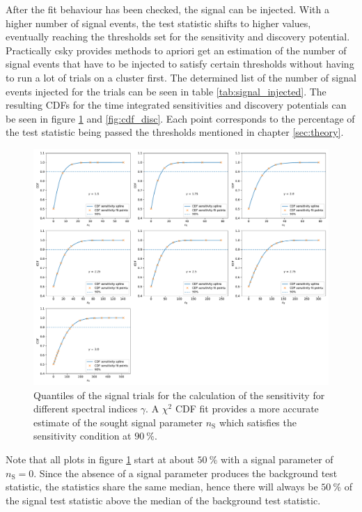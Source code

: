 After the fit behaviour has been checked, the signal can be injected.
With a higher number of signal events, the test statistic shifts to higher values, eventually reaching the thresholds set for the sensitivity and discovery potential.
Practically csky provides methods to apriori get an estimation of the number of signal events that have to be injected to satisfy certain thresholds without having to run a lot of trials on a cluster first.
The determined list of the number of signal events injected for the trials can be seen in table \ref{tab:signal_injected}.
The resulting CDFs for the time integrated sensitivities and discovery potentials can be seen in figure \ref{fig:cdf_sens} and \ref{fig:cdf_disc}.
Each point corresponds to the percentage of the test statistic being passed the thresholds mentioned in chapter \ref{sec:theory}.
\begin{figure}
    \centering
    \includegraphics[width=\linewidth]{Plots/05_csky/9_years_gfu_gold_cdf_sens.pdf}
    \caption{Quantiles of the signal trials for the calculation of the sensitivity for different spectral indices $\gamma$. A $\chi^2$ CDF fit provides a more accurate estimate of the sought signal parameter $n_\text{S}$ which satisfies the sensitivity condition at $\SI{90}{\percent}$.}
    \label{fig:cdf_sens}
\end{figure}
Note that all plots in figure \ref{fig:cdf_sens} start at about $\SI{50}{\percent}$ with a signal parameter of $n_\text{S} = 0$.
Since the absence of a signal parameter produces the background test statistic, the statistics share the same median, hence there will always be $\SI{50}{\percent}$ of the signal test statistic above the median of the background test statistic.
